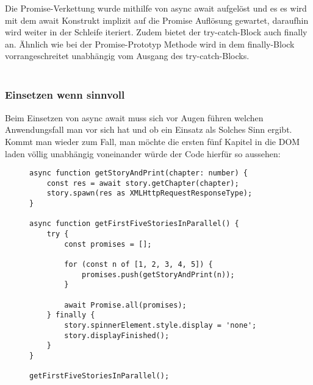 Die Promise-Verkettung wurde mithilfe von async await aufgelöst und es es wird mit dem await Konstrukt implizit auf die Promise Auflösung gewartet, daraufhin wird weiter in der Schleife iteriert. Zudem bietet der try-catch-Block auch finally an. Ähnlich wie bei der Promise-Prototyp Methode wird in dem finally-Block vorrangeschreitet unabhängig vom Ausgang des try-catch-Blocks.\\\\

\subsubsection{Einsetzen wenn sinnvoll}

Beim Einsetzen von async await muss sich vor Augen führen welchen Anwendungsfall man vor sich hat und ob ein Einsatz als Solches Sinn ergibt. Kommt man wieder zum Fall, man möchte die ersten fünf Kapitel in die DOM laden völlig unabhängig voneinander würde der Code hierfür so aussehen:

\begin{figure}[H]
\begin{lstlisting}
async function getStoryAndPrint(chapter: number) {
    const res = await story.getChapter(chapter);
    story.spawn(res as XMLHttpRequestResponseType);
}

async function getFirstFiveStoriesInParallel() {
    try {
        const promises = [];

        for (const n of [1, 2, 3, 4, 5]) {
            promises.push(getStoryAndPrint(n));
        }

        await Promise.all(promises);
    } finally {
        story.spinnerElement.style.display = 'none';
        story.displayFinished();
    }
}

getFirstFiveStoriesInParallel();
\end{lstlisting}
\end{figure}
